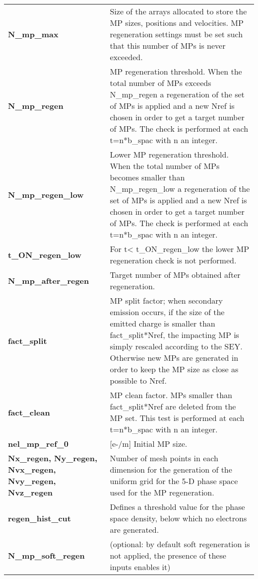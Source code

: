 \documentclass[a4paper,12pt]{article}
\begin{document}
\begin{longtable}{p{}p{}}
\hline\endfirsthead\hline\endhead\rowcolor{Gray}
\multicolumn{2}{p{.97\textwidth}}{
\textbf{MP management settings}
}\\ \hline
\textbf{N\_mp\_max}&	Size of the arrays allocated to store the MP sizes, positions and velocities. MP regeneration settings must be set such that this number of MPs is never exceeded.\\ \hline
\textbf{N\_mp\_regen}& 	MP regeneration threshold. When the total number of MPs exceeds N\_mp\_regen a regeneration of the set of MPs is applied and a new Nref is chosen in order to get a target number of MPs. The check is performed at each t=n*b\_spac with n an integer.\\ \hline
\textbf{N\_mp\_regen\_low}&	Lower MP regeneration threshold. When the total number of MPs becomes smaller than N\_mp\_regen\_low a regeneration of the set of MPs is applied and a new Nref is chosen in order to get a target number of MPs. The check is performed at each t=n*b\_spac with n an integer.\\ \hline
\textbf{t\_ON\_regen\_low}&	For t< t\_ON\_regen\_low the lower MP regeneration check is not performed.\\ \hline
\textbf{N\_mp\_after\_regen}&	Target number of MPs obtained after regeneration.\\ \hline
\textbf{fact\_split}&	MP split factor; when secondary emission occurs, if the size of the emitted charge is smaller than fact\_split*Nref, the impacting MP is simply rescaled according to the SEY. Otherwise new MPs are generated in order to keep the MP size as close as possible to Nref.\\ \hline
\textbf{fact\_clean}&	MP clean factor. MPs smaller than fact\_split*Nref are deleted from the MP set. This test is performed at each t=n*b\_spac with n an integer.\\ \hline
\textbf{nel\_mp\_ref\_0}&	[e-/m] Initial MP size.\\ \hline
\textbf{Nx\_regen, Ny\_regen, Nvx\_regen, Nvy\_regen, Nvz\_regen}&	Number of mesh points in each dimension for the generation of the uniform grid for the 5-D phase space used for the MP regeneration.\\ \hline
\textbf{regen\_hist\_cut}&	Defines a threshold value for the phase space density, below which no electrons are generated.\\ \hline
\textbf{N\_mp\_soft\_regen}&	(optional: by default soft regeneration is not applied, the presence of these inputs enables it)


\end{longtable}
\end{document}
